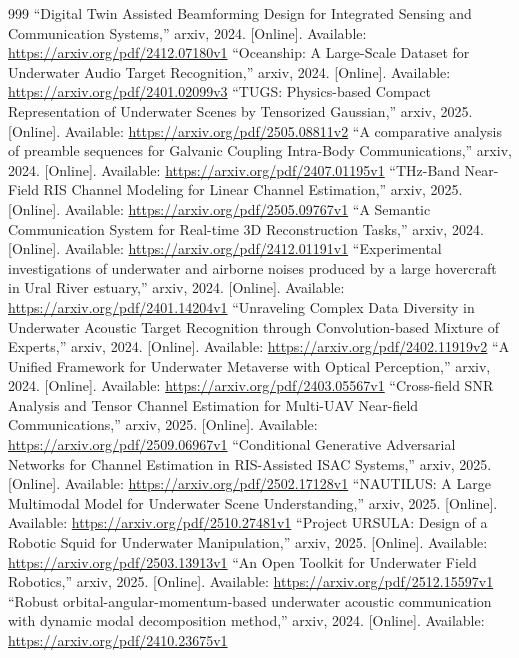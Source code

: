 \documentclass[10pt,journal]{IEEEtran}
\begin{document}
\begin{thebibliography}{999}
 ``Digital Twin Assisted Beamforming Design for Integrated Sensing and Communication Systems,'' arxiv, 2024. [Online]. Available: \url{https://arxiv.org/pdf/2412.07180v1}
 ``Oceanship: A Large-Scale Dataset for Underwater Audio Target Recognition,'' arxiv, 2024. [Online]. Available: \url{https://arxiv.org/pdf/2401.02099v3}
 ``TUGS: Physics-based Compact Representation of Underwater Scenes by Tensorized Gaussian,'' arxiv, 2025. [Online]. Available: \url{https://arxiv.org/pdf/2505.08811v2}
 ``A comparative analysis of preamble sequences for Galvanic Coupling Intra-Body Communications,'' arxiv, 2024. [Online]. Available: \url{https://arxiv.org/pdf/2407.01195v1}
 ``THz-Band Near-Field RIS Channel Modeling for Linear Channel Estimation,'' arxiv, 2025. [Online]. Available: \url{https://arxiv.org/pdf/2505.09767v1}
 ``A Semantic Communication System for Real-time 3D Reconstruction Tasks,'' arxiv, 2024. [Online]. Available: \url{https://arxiv.org/pdf/2412.01191v1}
 ``Experimental investigations of underwater and airborne noises produced by a large hovercraft in Ural River estuary,'' arxiv, 2024. [Online]. Available: \url{https://arxiv.org/pdf/2401.14204v1}
 ``Unraveling Complex Data Diversity in Underwater Acoustic Target Recognition through Convolution-based Mixture of Experts,'' arxiv, 2024. [Online]. Available: \url{https://arxiv.org/pdf/2402.11919v2}
 ``A Unified Framework for Underwater Metaverse with Optical Perception,'' arxiv, 2024. [Online]. Available: \url{https://arxiv.org/pdf/2403.05567v1}
 ``Cross-field SNR Analysis and Tensor Channel Estimation for Multi-UAV Near-field Communications,'' arxiv, 2025. [Online]. Available: \url{https://arxiv.org/pdf/2509.06967v1}
 ``Conditional Generative Adversarial Networks for Channel Estimation in RIS-Assisted ISAC Systems,'' arxiv, 2025. [Online]. Available: \url{https://arxiv.org/pdf/2502.17128v1}
 ``NAUTILUS: A Large Multimodal Model for Underwater Scene Understanding,'' arxiv, 2025. [Online]. Available: \url{https://arxiv.org/pdf/2510.27481v1}
 ``Project URSULA: Design of a Robotic Squid for Underwater Manipulation,'' arxiv, 2025. [Online]. Available: \url{https://arxiv.org/pdf/2503.13913v1}
 ``An Open Toolkit for Underwater Field Robotics,'' arxiv, 2025. [Online]. Available: \url{https://arxiv.org/pdf/2512.15597v1}
 ``Robust orbital-angular-momentum-based underwater acoustic communication with dynamic modal decomposition method,'' arxiv, 2024. [Online]. Available: \url{https://arxiv.org/pdf/2410.23675v1}

\end{thebibliography}
\end{document}
